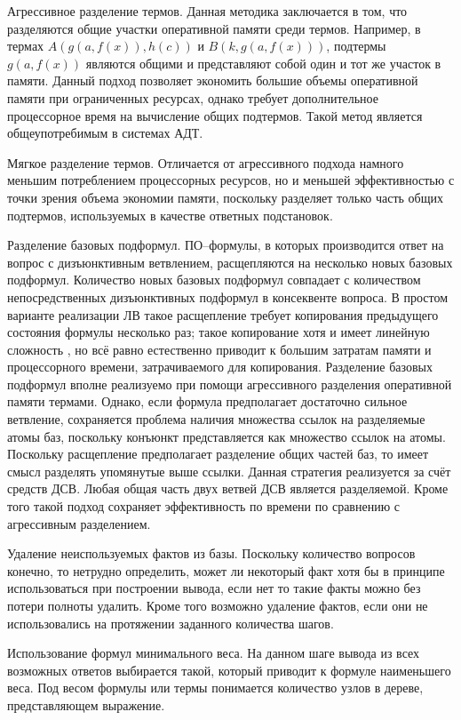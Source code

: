 \documentclass[a4paper]{report}
\begin{document}
Агрессивное разделение термов. Данная методика заключается в том, что разделяются общие участки оперативной памяти среди термов. Например, в термах $A(g(a,f(x)),h(c))$ и $B(k,g(a,f(x)))$, подтермы $g(a,f(x))$ являются общими и представляют собой один и тот же участок в памяти. Данный подход позволяет экономить большие объемы оперативной памяти при ограниченных ресурсах, однако требует дополнительное процессорное время на вычисление общих подтермов. Такой метод является общеупотребимым в системах АДТ.

Мягкое разделение термов. Отличается от агрессивного подхода намного меньшим потреблением процессорных ресурсов, но и меньшей эффективностью с точки зрения объема экономии памяти, поскольку разделяет только часть общих подтермов, используемых в качестве ответных подстановок.

Разделение базовых подформул. ПО--формулы, в которых производится ответ на вопрос с дизъюнктивным ветвлением, расщепляются на несколько новых базовых подформул. Количество новых базовых подформул совпадает с количеством непосредственных дизъюнктивных подформул в консеквенте вопроса. В простом варианте реализации ЛВ \cite{dissChe} такое расщепление требует копирования предыдущего состояния формулы несколько раз; такое копирование хотя и имеет линейную сложность \cite{Che2}, но всё равно естественно приводит к большим затратам памяти и процессорного времени, затрачиваемого для копирования. Разделение базовых подформул вполне реализуемо при помощи агрессивного разделения оперативной памяти термами. Однако, если формула предполагает достаточно сильное ветвление, сохраняется проблема наличия множества ссылок на разделяемые атомы баз, поскольку конъюнкт представляется как множество ссылок на атомы. Поскольку расщепление предполагает разделение общих частей баз, то имеет смысл разделять упомянутые выше ссылки. Данная стратегия реализуется за счёт средств ДСВ. Любая общая часть двух ветвей ДСВ является разделяемой. Кроме того такой подход сохраняет эффективность по времени по сравнению с агрессивным разделением.

Удаление неиспользуемых фактов из базы. Поскольку количество вопросов конечно, то нетрудно определить, может ли некоторый факт хотя бы в принципе использоваться при построении вывода, если нет то такие факты можно без потери полноты удалить. Кроме того возможно удаление фактов, если они не использовались на протяжении заданного количества шагов.

Использование формул минимального веса. На данном шаге вывода из всех возможных ответов выбирается такой, который приводит к формуле наименьшего веса. Под весом формулы или термы понимается количество узлов в дереве, представляющем выражение.
\end{document}
